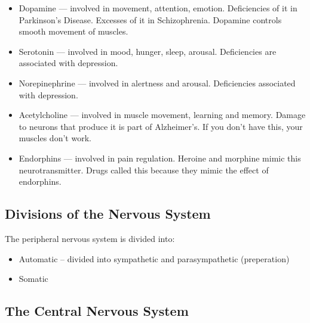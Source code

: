 \documentclass[12pt]{article}
\begin{document}
\begin{itemize}
    \item Dopamine --- involved in movement, attention, emotion. Deficiencies of
        it in Parkinson's Disease. Excesses of it in Schizophrenia. Dopamine
        controls smooth movement of muscles.
    \item Serotonin --- involved in mood, hunger, sleep, arousal. Deficiencies
        are associated with depression.
    \item Norepinephrine --- involved in alertness and arousal. Deficiencies
        associated with depression.
    \item Acetylcholine --- involved in muscle movement, learning and memory.
        Damage to neurons that produce it is part of Alzheimer's. If you don't
        have this, your muscles don't work.
    \item Endorphins --- involved in pain regulation. Heroine and morphine mimic
        this neurotransmitter. Drugs called this because they mimic the effect of
        endorphins.
\end{itemize}

\subsection{Divisions of the Nervous System}

The peripheral nervous system is divided into:
\begin{itemize}
    \item Automatic -- divided into sympathetic  and parasympathetic
        (preperation)
    \item Somatic
\end{itemize}

\subsection{The Central Nervous System}
\end{document}
